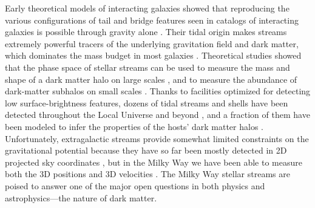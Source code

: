 \documentclass[final,5p,times,twocolumn,authoryear]{elsarticle}
\begin{document}
Early theoretical models of interacting galaxies showed that reproducing the various configurations of tail and bridge features seen in catalogs of interacting galaxies \citep{vorontsov-velyaminov:1959, arp:1966} is possible through gravity alone \citep{pfleiderer:1963, toomre:1972}.
Their tidal origin makes streams extremely powerful tracers of the underlying gravitation field and dark matter, which dominates the mass budget in most galaxies \citep[e.g.,][]{moster:2010, behroozi:2019}.
Theoretical studies showed that the phase space of stellar streams can be used to measure the mass and shape of a dark matter halo on large scales \citep{springel:1999, dubinski:1999}, and to measure the abundance of dark-matter subhalos on small scales \citep{johnston:2002, ibata:2002, siegal-gaskins:2008}.
Thanks to facilities optimized for detecting low surface-brightness features, dozens of tidal streams and shells have been detected throughout the Local Universe \citep[e.g.,][]{martinez-delgado:2010, martinez-delgado:2023, bilek:2020} and beyond \citep[e.g.,][]{kado-fong:2018, ren:2020}, and a fraction of them have been modeled to infer the properties of the hosts' dark matter halos \citep{amorisco:2015, vandokkum:2019, pearson:2022}.
Unfortunately, extragalactic streams provide somewhat limited constraints on the gravitational potential because they have so far been mostly detected in 2D projected sky coordinates \citep{nibauer:2023}, but in the Milky Way we have been able to measure both the 3D positions and 3D velocities \citep{koposov:2010}.
The Milky Way stellar streams are poised to answer one of the major open questions in both physics and astrophysics---the nature of dark matter.
\end{document}
